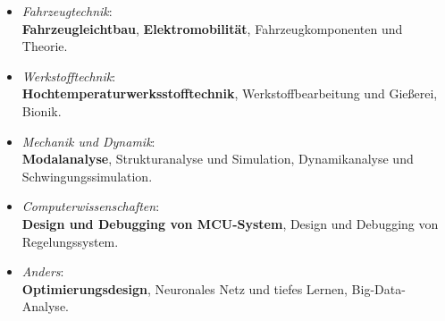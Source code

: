 \documentclass{resume}
\begin{document}
\begin{itemize}
	\setlength{\itemsep}{4pt}
	
  \item {\large \textit{Fahrzeugtechnik}\hspace{1mm}:}\\[1mm]
	{\large \textbf{Fahrzeugleichtbau}, \hspace{1mm} \textbf{Elektromobilität}, \hspace{1mm} Fahrzeugkomponenten und Theorie.}
	
  \item {\large \textit{Werkstofftechnik}\hspace{1mm}:}\\[1mm]
	{\large \textbf{Hochtemperaturwerksstofftechnik}, \hspace{1mm} Werkstoffbearbeitung und Gießerei, \hspace{1mm} Bionik.}
	
  \item {\large \textit{Mechanik und Dynamik}\hspace{1mm}:} \\[1mm]
	{\large \textbf{Modalanalyse},\hspace{1mm} Strukturanalyse und Simulation,\hspace{1mm} Dynamikanalyse und Schwingungs\-simulation.}
	
  \item {\large \textit{Computerwissenschaften}\hspace{1mm}:} \\[1mm]
	{\large \textbf{Design und Debugging von MCU-System}, Design und Debugging von Regelungssystem.}
	
  \item {\large \textit{Anders}\hspace{1mm}:} \\[1mm]
	{\large \textbf{Optimierungsdesign},\hspace{1mm} Neuronales Netz und tiefes Lernen, \hspace{1mm} Big-Data-Analyse.}
\end{itemize}
\end{document}
